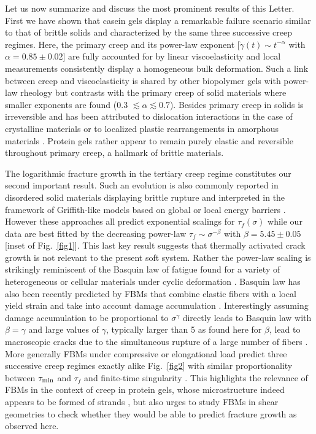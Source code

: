 \documentclass[twocolumn,superscriptaddress,showpacs,preprintnumbers,amsmath,amssymb,prl]{revtex4}
\newcommand\gp{\dot\gamma}
\begin{document}
Let us now summarize and discuss the most prominent results of this Letter. First we have shown that casein gels display a remarkable failure scenario similar to that of brittle solids and characterized by the same three successive creep regimes. Here, the primary creep and its power-law exponent [$\gp(t)\sim t^{-\alpha}$ with $\alpha=0.85\pm 0.02$] are fully accounted for by linear viscoelasticity and local measurements consistently display a homogeneous bulk deformation. Such a link between creep and viscoelasticity is shared by other biopolymer gels with power-law rheology \cite{Gobeaux:2010,Jaishankar:2013} but contrasts with the primary creep of solid materials where smaller exponents are found (0.3 $\lesssim \alpha \lesssim 0.7$). Besides primary creep in solids is irreversible and has been attributed to dislocation interactions in the case of crystalline materials \cite{Miguel:2002} or to localized plastic rearrangements in amorphous materials \cite{Rosti:2010}. Protein gels rather appear to remain purely elastic and reversible throughout primary creep, a hallmark of brittle materials.

The logarithmic fracture growth in the tertiary creep regime constitutes our second important result. Such an evolution is also commonly reported in disordered solid materials displaying brittle rupture and interpreted in the framework of Griffith-like models based on global or local energy barriers \cite{Vanel:2009}. However these approaches all predict exponential scalings for $\tau_f(\sigma)$ while our data are best fitted by the decreasing power-law $\tau_f \sim \sigma^{-\beta}$ with $\beta=5.45\pm 0.05$ [inset of Fig.~\ref{fig1}]. This last key result suggests that thermally activated crack growth is not relevant to the present soft system. Rather the power-law scaling is strikingly reminiscent of the Basquin law of fatigue found for a variety of heterogeneous or cellular materials under cyclic deformation \cite{Kun:2007,Basquin:1910,Suresh:2006}. Basquin law has also been recently predicted by FBMs that combine elastic fibers with a local yield strain and take into account damage accumulation \cite{Kun:2007,Halasz:2012}. Interestingly assuming damage accumulation to be proportional to $\sigma^\gamma$ directly leads to Basquin law with $\beta=\gamma$ and large values of $\gamma$, typically larger than 5 as found here for $\beta$, lead to macroscopic cracks due to the simultaneous rupture of a large number of fibers \cite{Halasz:2012}. More generally FBMs under compressive or elongational load predict three successive creep regimes exactly alike Fig.~\ref{fig2} with similar proportionality between $\tau_{\rm min}$ and $\tau_f$ and finite-time singularity \cite{Nechad:2005,Jagla:2011}. This highlights the relevance of FBMs in the context of creep in protein gels, whose microstructure indeed appears to be formed of strands \cite{Kalab:1983,Roefs:1990}, but also urges to study FBMs in shear geometries to check whether they would be able to predict fracture growth as observed here.
\end{document}
